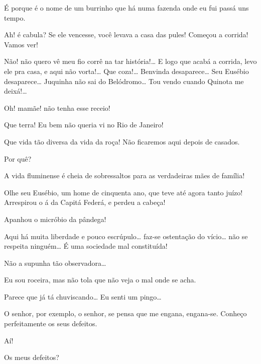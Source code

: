  É porque é o nome de um burrinho que há numa fazenda onde eu fui 
passá uns tempo.

 Ah! é cabula?  Se ele 
vencesse, você levava a casa das pules!  Começou a corrida! Vamos ver! 


  Não! não
quero vê meu fio corrê na tar história!\ldots{} E logo que acabá a corrida, levo ele
pra casa, e aqui não vorta!\ldots{} Que coza!\ldots{} Benvinda desaparece\ldots{} Seu Eusébio
desaparece\ldots{} Juquinha não sai do Belódromo\ldots{} Tou vendo cuando Quinota me deixá!\ldots{}

 Oh! mamãe! não tenha esse receio!

 Que terra! Eu bem não queria vi no Rio de Janeiro!

 Que vida tão diversa da vida da roça!  Não ficaremos
aqui depois de casados.

 Por quê?

 A vida fluminense é cheia de sobressaltos para as verdadeiras
mães de família!

 Olhe seu Eusébio, um home de cinquenta ano, que teve até agora 
tanto juízo! Arrespirou o á da Capitá Federá, e perdeu a cabeça!

 Apanhou o micróbio da pândega!

 Aqui há muita liberdade e pouco escrúpulo\ldots{} faz-se ostentação do 
vício\ldots{} não se respeita ninguém\ldots{} É uma sociedade mal constituída!

 Não a supunha tão observadora\ldots{}

 Eu sou roceira, mas não tola que não veja o mal onde se acha.

 Parece que já tá chuviscando\ldots{} Eu senti um pingo\ldots{}

 O senhor, por exemplo, o senhor, se pensa que me engana,
engana-se. Conheço perfeitamente os seus defeitos.

  Aí!

 Os meus defeitos?

